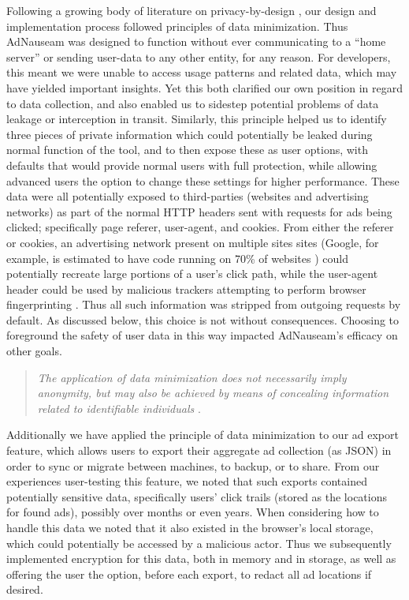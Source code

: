 \documentclass[conference]{IEEEtran}
\begin{document}
Following a growing body of literature on privacy-by-design \cite{Gurses-0, Hoepman, Gurses-1, Hansen, Cavoukian}, our design and implementation process followed principles of data minimization. Thus AdNauseam was designed to function without ever communicating to a “home server” or sending user-data to any other entity, for any reason. For developers, this meant we were unable to access usage patterns and related data, which may have yielded important insights. Yet this both clarified our own position in regard to data collection, and also enabled us to sidestep potential problems of data leakage or interception in transit. Similarly, this principle helped us to identify three pieces of private information which could potentially be leaked during normal function of the tool, and to then expose these as user options, with defaults that would provide normal users with full protection, while allowing advanced users the option to change these settings for higher performance. These data were all potentially exposed to third-parties (websites and advertising networks) as part of the normal HTTP headers sent with requests for ads being clicked; specifically page referer, user-agent, and cookies. From either the referer or cookies, an advertising network present on multiple sites sites (Google, for example, is estimated to have code running on 70\% of websites \cite{Englehardt}) could potentially recreate large portions of a user's click path, while the user-agent header could be used by malicious trackers attempting to perform browser fingerprinting \cite{Nikiforakis}. Thus all such information was stripped from outgoing requests by default. As discussed below, this choice is not without consequences. Choosing to foreground the safety of user data in this way impacted AdNauseam's efficacy on other goals.

\vspace{3mm}
\blockquote{\emph{The application of data minimization does not necessarily imply anonymity, but may also be achieved by means of concealing information related to identifiable individuals} \cite{Gurses-0}.}
\vspace{2mm}

\noindent Additionally we have applied the principle of data minimization to our ad export feature, which allows users to export their aggregate ad collection (as JSON) in order to sync or migrate between machines, to backup, or to share. From our experiences user-testing this feature, we noted that such exports contained potentially sensitive data, specifically users' click trails (stored as the locations for found ads), possibly over months or even years. When considering how to handle this data we noted that it also existed in the browser's local storage, which could potentially be accessed by a malicious actor. Thus we subsequently implemented encryption for this data, both in memory and in storage, as well as offering the user the option, before each export, to redact all ad locations if desired.
\end{document}
